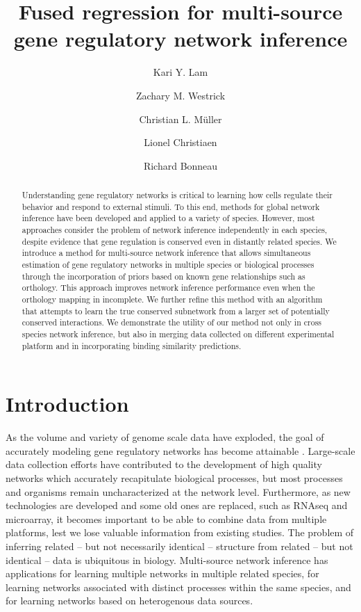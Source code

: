 \documentclass[11pt]{article}
\begin{document}
\title{Fused regression for multi-source gene regulatory network inference}
\author{Kari Y. Lam \and Zachary M. Westrick \and Christian L. M\"{u}ller \and Lionel Christiaen \and Richard Bonneau}
\maketitle

\begin{abstract}
Understanding gene regulatory networks is critical to learning how cells regulate their behavior and respond to external stimuli. To this end, methods for global network inference have been developed and applied to a variety of species. However, most approaches consider the problem of network inference independently in each species, despite evidence that gene regulation is conserved even in distantly related species. We introduce a method for multi-source network inference that allows simultaneous estimation of gene regulatory networks in multiple species or biological processes through the incorporation of priors based on known gene relationships such as orthology. This approach improves network inference performance even when the orthology mapping in incomplete. We further refine this method with an algorithm that attempts to learn the true conserved subnetwork from a larger set of potentially conserved interactions. We demonstrate the utility of our method not only in cross species network inference, but also in merging data collected on different experimental platform and in incorporating binding similarity predictions.
\end{abstract}

\section{Introduction}
As the volume and variety of genome scale data have exploded, the goal of accurately modeling gene regulatory networks has become attainable \cite{bonneau_predictive_2007, ciofani_validated_2012, carro_transcriptional_2010}. Large-scale data collection efforts have contributed to the development of high quality networks which accurately recapitulate biological processes, but most processes and organisms remain uncharacterized at the network level. Furthermore, as new technologies are developed and some old ones are replaced, such as RNAseq and microarray, it becomes important to be able to combine data from multiple platforms, lest we lose valuable information from existing studies. The problem of inferring related -- but not necessarily identical -- structure from related -- but not identical -- data is ubiquitous in biology. Multi-source network inference has applications for learning multiple networks in multiple related species, for learning networks associated with distinct processes within the same species, and for learning networks based on heterogenous data sources.
\end{document}
